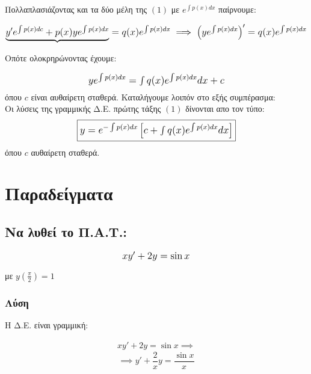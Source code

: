 \documentclass[12pt,a4paper]{article}
\begin{document}
Πολλαπλασιάζοντας και τα δύο μέλη της $(1)$ με \(e^{\int p(x)dx}\) παίρνουμε:

\begin{equation*}
\mbox{\large\(\underbrace{y'e^{\int p(x)dc} + p(x)ye^{\int p(x)dx}}=q(x)e^{\int p(x)dx} \implies \left(ye^{\int p(x)dx}\right)' = q(x)e^{\int p(x)dx}\)}
\end{equation*}

Οπότε ολοκρηρώνοντας έχουμε:

\begin{equation*}
\mbox{\large\( 
ye^{\int p(x)dx}=\int q(x)e^{\int p(x)dx}dx +c
\)} 
\end{equation*}
όπου $c$ είναι αυθαίρετη σταθερά. Καταλήγουμε λοιπόν στο εξής συμπέρασμα: \\

Οι λύσεις της γραμμικής Δ.Ε. πρώτης τάξης $(1)$ δίνονται απο τον τύπο: \\


\begin{equation*}
\boxed{\mbox{\large\( 
y=e^{-\int p(x)dx} \left[c+ \int q(x)e^{\int p(x)dx}dx\right]
\)}} 
\end{equation*}
όπου $c$ αυθαίρετη σταθερά.

\vspace{2cm}

\section{Παραδείγματα}

\subsection{Να λυθεί το Π.Α.Τ.:} 

\begin{equation*}
\mbox{\large\(xy'+2y=\sin x \)}
\end{equation*}


με \(y\left(\frac{\pi}{2}\right)=1\)

\subsubsection*{Λύση}

Η Δ.Ε. είναι γραμμική:

\begin{gather*}
xy'+2y=\sin x \implies
\end{gather*}
\begin{equation} \tag{1}
\implies y'+\frac{2}{x}y=\frac{\sin x}{x}
\end{equation}
\end{document}
